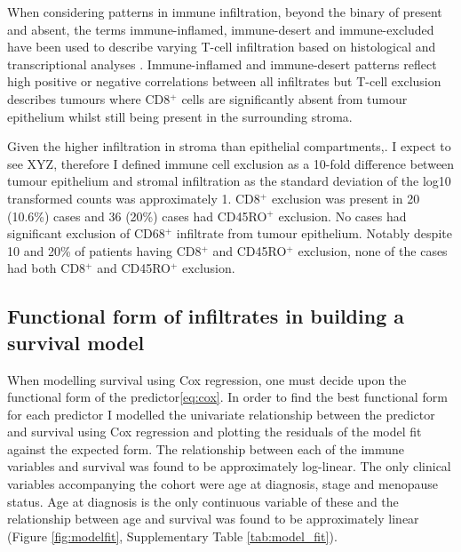 When considering patterns in immune infiltration, beyond the binary of present and absent, the terms immune-inflamed, immune-desert and immune-excluded have been used to describe varying T-cell infiltration based on histological and transcriptional analyses \cite{}. Immune-inflamed and immune-desert patterns reflect high positive or negative correlations between all infiltrates but T-cell exclusion describes tumours where CD8$^+$ cells are significantly absent from tumour epithelium whilst still being present in the surrounding stroma\cite{26,27}. 

Given the higher infiltration in stroma than epithelial compartments,. I expect to see XYZ, therefore I defined immune cell exclusion as a 10-fold difference between tumour epithelium and stromal infiltration as the standard deviation of the log10 transformed counts was approximately 1. CD8$^+$ exclusion was present in 20 (10.6\%) cases and 36 (20\%) cases had CD45RO$^+$ exclusion. No cases had significant exclusion of CD68$^+$ infiltrate from tumour epithelium.  Notably despite 10 and 20\% of patients having CD8$^+$ and CD45RO$^+$ exclusion, none of the cases had both CD8$^+$ and CD45RO$^+$ exclusion. %



\subsection{Functional form of infiltrates in building a survival model}
When modelling survival using Cox regression, one must decide upon the functional form of the predictor\ref{eq:cox}.  In order to find the best functional form for each predictor I modelled the univariate relationship between the predictor and survival using Cox regression and plotting the residuals of the model fit against the expected form. The relationship between each of the immune variables and survival was found to be approximately log-linear. The only clinical variables accompanying the cohort were age at diagnosis, stage and menopause status. Age at diagnosis is the only continuous variable of these and the relationship between age and survival was found to be approximately linear (Figure \ref{fig:modelfit}, Supplementary Table \ref{tab:model_fit}). 

